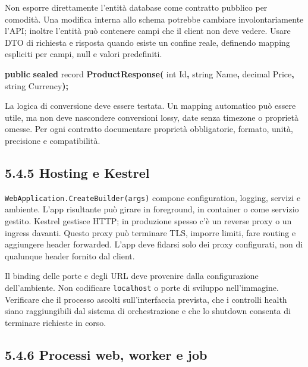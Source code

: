 \documentclass[
  italian,
  10pt,
]{book}
\newenvironment{Shaded}{\begin{snugshade}}{\end{snugshade}}
\newcommand{\DataTypeTok}[1]{\textcolor[rgb]{0.13,0.29,0.53}{#1}}
\newcommand{\FunctionTok}[1]{\textcolor[rgb]{0.13,0.29,0.53}{\textbf{#1}}}
\newcommand{\KeywordTok}[1]{\textcolor[rgb]{0.13,0.29,0.53}{\textbf{#1}}}
\newcommand{\NormalTok}[1]{#1}
\newcommand{\OperatorTok}[1]{\textcolor[rgb]{0.81,0.36,0.00}{\textbf{#1}}}
\begin{document}
Non esporre direttamente l'entità database come contratto pubblico per
comodità. Una modifica interna allo schema potrebbe cambiare
involontariamente l'API; inoltre l'entità può contenere campi che il
client non deve vedere. Usare DTO di richiesta e risposta quando esiste
un confine reale, definendo mapping espliciti per campi, null e valori
predefiniti.

\begin{Shaded}
\begin{Highlighting}[]
\KeywordTok{public} \KeywordTok{sealed}\NormalTok{ record }\FunctionTok{ProductResponse}\OperatorTok{(}
    \DataTypeTok{int}\NormalTok{ Id}\OperatorTok{,} \DataTypeTok{string}\NormalTok{ Name}\OperatorTok{,} \DataTypeTok{decimal}\NormalTok{ Price}\OperatorTok{,} \DataTypeTok{string}\NormalTok{ Currency}\OperatorTok{);}
\end{Highlighting}
\end{Shaded}

La logica di conversione deve essere testata. Un mapping automatico può
essere utile, ma non deve nascondere conversioni lossy, date senza
timezone o proprietà omesse. Per ogni contratto documentare proprietà
obbligatorie, formato, unità, precisione e compatibilità.

\subsection{5.4.5 Hosting e Kestrel}\label{hosting-e-kestrel}

\texttt{WebApplication.CreateBuilder(args)} compone configuration,
logging, servizi e ambiente. L'app risultante può girare in foreground,
in container o come servizio gestito. Kestrel gestisce HTTP; in
produzione spesso c'è un reverse proxy o un ingress davanti. Questo
proxy può terminare TLS, imporre limiti, fare routing e aggiungere
header forwarded. L'app deve fidarsi solo dei proxy configurati, non di
qualunque header fornito dal client.

Il binding delle porte e degli URL deve provenire dalla configurazione
dell'ambiente. Non codificare \texttt{localhost} o porte di sviluppo
nell'immagine. Verificare che il processo ascolti sull'interfaccia
prevista, che i controlli health siano raggiungibili dal sistema di
orchestrazione e che lo shutdown consenta di terminare richieste in
corso.

\subsection{5.4.6 Processi web, worker e
job}\label{processi-web-worker-e-job}
\end{document}

